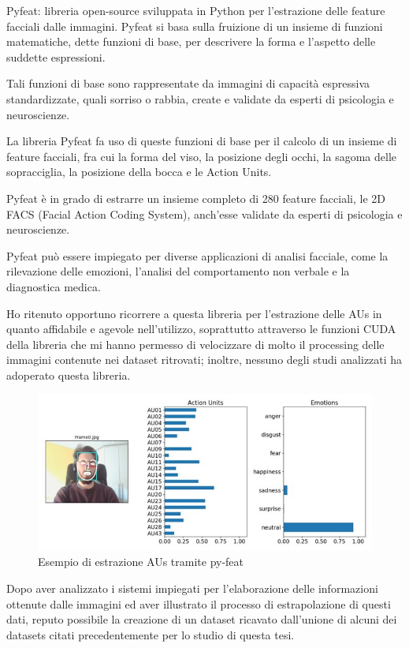 Pyfeat: libreria open-source sviluppata in Python per l'estrazione delle feature facciali dalle immagini. Pyfeat si basa sulla fruizione di un insieme di funzioni matematiche, dette funzioni di base, per descrivere la forma e l'aspetto delle suddette espressioni. 
    
Tali funzioni di base sono rappresentate da immagini di capacità espressiva standardizzate, quali sorriso o rabbia, create e validate da esperti di psicologia e neuroscienze. 

La libreria Pyfeat fa uso di queste funzioni di base per il calcolo di un insieme di feature facciali, fra cui la forma del viso, la posizione degli occhi, la sagoma delle sopracciglia, la posizione della bocca e le Action Units. 

Pyfeat è in grado di estrarre un insieme completo di 280 feature facciali, le 2D FACS (Facial Action Coding System), anch’esse validate da esperti di psicologia e neuroscienze. 

Pyfeat può essere impiegato per diverse applicazioni di analisi facciale, come la rilevazione delle emozioni, l'analisi del comportamento non verbale e la diagnostica medica. 

Ho ritenuto opportuno ricorrere a questa libreria per l’estrazione delle AUs in quanto affidabile e agevole nell’utilizzo, soprattutto attraverso le funzioni CUDA della libreria che mi hanno permesso di velocizzare di molto il processing delle immagini contenute nei dataset ritrovati; inoltre, nessuno degli studi analizzati ha adoperato questa libreria.
\begin{figure}
    \begin{center}    
        \includegraphics[width=1\linewidth]{images/13.jpg}
        \caption{Esempio di estrazione AUs tramite py-feat}
    \end{center}
\end{figure}

Dopo aver analizzato i sistemi impiegati per l’elaborazione delle informazioni ottenute dalle immagini ed aver illustrato il processo di estrapolazione di questi dati, reputo possibile la creazione di un dataset ricavato dall’unione di alcuni dei datasets citati precedentemente per lo studio di questa tesi.

